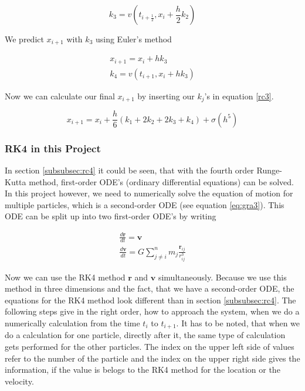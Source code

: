 \documentclass[10pt,a4paper]{article}
\begin{document}
\begin{equation}
\label{rc6}
k_3 =  v(t_{i+\frac{1}{2}}, x_i+\frac{h}{2} k_2)
\end{equation}

We predict $x_{i+1}$ with $k_3$ using Euler's method

\begin{align}
x_{i+1} = x_i + h k_3 \\
k_4 = v(t_{i+1}, x_i + h k_3)
\end{align}

Now we can calculate our final $x_{i+1}$ by inserting our $k_j$'s in equation \eqref{rc3}.

\begin{equation}
\label{rc9}
x_{i+1} =  x_i + \frac{h}{6} (k_1 + 2 k_2 + 2 k_3 + k_4) + \sigma(h^5)
\end{equation}

\subsubsection{RK4 in this Project}

In section \ref{subsubsec:rc4} it could be seen, that with the fourth order Runge-Kutta method, first-order ODE's (ordinary differential equations) can be solved. In this project however, we need to numerically solve the equation of motion for multiple particles, which is a second-order ODE (see equation \eqref{eq:gra3}). This ODE can be split up into two first-order ODE's by writing

\begin{align}
\frac{d\mathbf{r}}{dt} = \mathbf{v}  \\
\frac{d\mathbf{v}}{dt} = G \sum_{j \neq i}^{n} m_j \frac{\mathbf{r}_{ij}}{r_{ij}^3}
\end{align}

Now we can use the RK4 method $\mathbf{r}$ and $\mathbf{v}$ simultaneously. Because we use this method in three dimensions and the fact, that we have a second-order ODE, the equations for the RK4 method look different than in section \ref{subsubsec:rc4}. The following steps give in the right order, how to approach the system, when we do a numerically calculation from the time $t_i$ to $t_{i+1}$. It has to be noted, that when we do a calculation for one particle, directly after it, the same type of calculation gets performed for the other particles. The index on the upper left side of values refer to the number of the particle and the index on the upper right side gives the information, if the value is belogs to the RK4 method for the location or the velocity.
\end{document}
